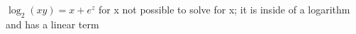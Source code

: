 {$\log_2{(xy)=x+e^z}$ for x}
{not possible to solve for x; it is inside of a logarithm and has a linear term}
